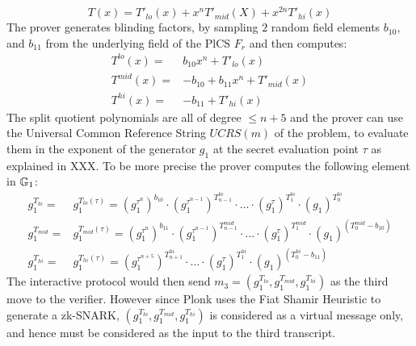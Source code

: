 \begin{equation}
T(x) = T'_{lo}(x) + x^n T'_{mid}(X) + x^{2n} T'_{hi}(x)
\end{equation}
The prover generates blinding factors, by sampling $2$ random field elements $b_{10}$, and $b_{11}$ from the underlying field of the PlCS $F_r$ and then computes:
\begin{equation}
\begin{array}{rl}
T^{lo}(x)  = & b_{10} x^n + T'_{lo}(x) \\
T^{mid}(x) = & - b_{10} + b_{11} x^n +T'_{mid}(x) \\
T^{hi}(x)  = & - b_{11} + T'_{hi}(x)
\end{array}
\end{equation}
The split quotient polynomials are all of degree $\leq n+5$ and the prover can use the Universal Common Reference String $UCRS(m)$ of the problem, to evaluate them in the exponent of the generator $g_1$ at the secret evaluation point $\tau$ as explained in XXX. To be more precise the prover computes the following element in $\mathbb{G}_1$: 
\begin{equation}
\begin{array}{rl}
g_1^{T_{lo}} = & g_1^{T_{lo}(\tau)} = \left(g_1^{\tau^n}\right)^{b_{10}}\cdot
\left(g_1^{\tau^{n-1}}\right)^{T^{lo}_{n-1}}\cdot\ldots\cdot \left(g_1^{\tau}\right)^{T^{lo}_{1}}\cdot \left(g_1\right)^{T^{lo}_{0}}\\
g_1^{T_{mid}} = & g_1^{T_{mid}(\tau)} = \left(g_1^{\tau^n}\right)^{b_{11}}\cdot
\left(g_1^{\tau^{n-1}}\right)^{T^{mid}_{n-1}}\cdot\ldots\cdot \left(g_1^{\tau}\right)^{T^{mid}_{1}}\cdot \left(g_1\right)^{(T^{mid}_{0}-b_{10})}\\
g_1^{T_{hi}} = & g_1^{T_{hi}(\tau)} =
\left(g_1^{\tau^{n+5}}\right)^{T^{hi}_{n+1}}\cdot\ldots\cdot \left(g_1^{\tau}\right)^{T^{hi}_{1}}\cdot \left(g_1\right)^{(T^{hi}_{0}-b_{11})}
\end{array}
\end{equation}
The interactive protocol would then send $m_3=(g_1^{T_{lo}}, g_1^{T_{mid}}, g_1^{T_{hi}})$ as the third move to the verifier. However since Plonk uses the Fiat Shamir Heuristic to generate a zk-SNARK, $(g_1^{T_{lo}}, g_1^{T_{mid}}, g_1^{T_{hi}})$ is considered as a virtual message only, and hence must be considered as the input to the third transcript.

